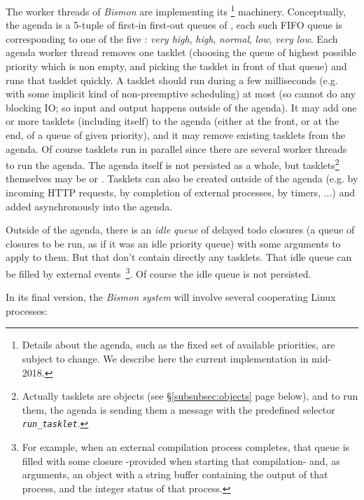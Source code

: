The worker threads of \emph{Bismon} are implementing its
 \footnote{Details about the agenda,
  such as the fixed set of available priorities, are subject to
  change. We describe here the current implementation in mid-2018.}
machinery. Conceptually, the agenda is a 5-tuple of first-in first-out
queues of , each such FIFO queue is
corresponding to one of the five  :
\emph{very high}, \emph{high}, \emph{normal}, \emph{low}, \emph{very
  low}. Each agenda worker thread removes one tasklet (choosing the
queue of highest possible priority which is non empty, and picking the
tasklet in front of that queue) and runs that tasklet quickly. A
tasklet should run during a few milliseconds (e.g. with some implicit
kind of non-preemptive scheduling) at most (so cannot do any blocking
IO; so input and output happens outside of the agenda). It may add one
or more tasklets (including itself) to the agenda (either at the
front, or at the end, of a queue of given priority), and it may remove
existing tasklets from the agenda. Of course tasklets run in parallel
since there are several worker threads to run the agenda. The agenda
itself is not persisted as a whole, but tasklets\footnote{Actually
  tasklets are objects (see §\ref{subsubsec:objects} page
  \pageref{subsubsec:objects} below), and to run them, the agenda is
  sending them a message with the predefined selector
  \texttt{\emph{run\_tasklet}}.}  themselves may be
 or .
Tasklets can also be created outside of the agenda (e.g. by incoming
HTTP requests, by completion of external processes, by timers, ...)
and added asynchronously into the agenda.

Outside of the agenda, there is an \emph{idle queue} of delayed todo
closures (a queue of closures to be run, as if it was an idle priority
queue) with some arguments to apply to them. But that  don't contain directly any tasklets. That idle
queue can be filled by external events~\footnote{For example, when an
  external compilation process completes, that queue is filled with
  some closure -provided when starting that compilation- and, as
  arguments, an object with a string buffer containing the output of
  that process, and the integer status of that process.}. Of course the idle
queue is not persisted.

\bigskip

In its final version, the \emph{Bismon system} will involve several
cooperating Linux processes:

